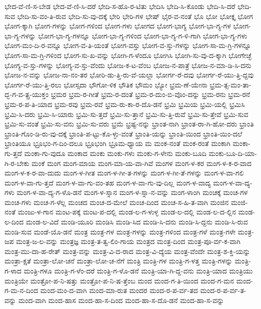 {ಭೇದ-ವೆ-ಣಿ-ಸ-ಬೇಡ
ಭೇದ-ವೆ-ಣಿ-ಸಿ-ದರೆ
ಭೇದಿ-ಸ-ಹೊ-ರ-ಟಿತು
ಭೇದಿಸಿ
ಭೇದಿ-ಸಿ-ಕೊಂಡು
ಭೇದಿ-ಸಿ-ದರೆ
ಭೇದಿ-ಸುವ
ಭೇದಿ-ಸು-ವಂ-ತಿ-ರುವ
ಭೇದಿ-ಸು-ವು-ದಕ್ಕೆ
ಭೇರಿ
ಭೇರಿ-ಗಳ
ಭೇಷ್
ಭೈರ-ವ-ನಂತೆ
ಭೊ
ಭೋ
ಭೋಕ್ತೃ
ಭೋಗ
ಭೋಗ-ಕ್ಕಾಗಿ
ಭೋಗ-ಗಳನ್ನು
ಭೋಗ-ಗಳಿಂದ
ಭೋಗ-ಗಳು
ಭೋಗದ
ಭೋಗ-ಭಾಗ್ಯ
ಭೋಗ-ಭಾ-ಗ್ಯ-ಗಳ
ಭೋಗ-ಭಾ-ಗ್ಯ-ಗಳನ್ನು
ಭೋಗ-ಭಾ-ಗ್ಯ-ಗಳನ್ನೂ
ಭೋಗ-ಭಾ-ಗ್ಯ-ಗಳಿಂದ
ಭೋಗ-ಭಾ-ಗ್ಯ-ಗ-ಳಿ-ಗಾಗಿ
ಭೋಗ-ಭಾ-ಗ್ಯ-ಗಳು
ಭೋಗ-ಮಂ-ದಿ-ರ-ವನ್ನೂ
ಭೋಗ-ವ-ತಿ-ಯಂತೆ
ಭೋಗ-ವಸ್ತು
ಭೋಗ-ವ-ಸ್ತು-ಗಳನ್ನು
ಭೋಗ-ಸಾ-ಮ-ಗ್ರಿ-ಗಳನ್ನೂ
ಭೋಗ-ಸಾ-ಮ-ಗ್ರಿ-ಗಳಿಂದ
ಭೋಗ-ಸು-ಖ-ವನ್ನು
ಭೋಗಿ-ಗ-ಳೆಂದೂ
ಭೋಗಿಸಿ
ಭೋಗಿ-ಸು-ವು-ದ-ಕ್ಕಾಗಿ
ಭೋಗೇಚ್ಛೆ
ಭೋಗ್ಯ-ವ-ಸ್ತು-ಗಳನ್ನು
ಭೋಗ್ಯ-ವ-ಸ್ತು-ವೆಂದು
ಭೋಜ-ಕ-ಟ-ವೆಂಬ
ಭೋಜ-ನ-ಪಾತ್ರೆ
ಭೋಜ-ನ-ಮಾ-ಡಿ-ಸಿ-ದನು
ಭೋಜ-ನ-ವನ್ನು
ಭೋಜ-ನಾ-ನಂ-ತರ
ಭೋರಿ-ಡು-ತ್ತಿ-ರು-ವೆ-ಯಲ್ಲಾ
ಭೋರ್ಗ-ರೆ-ದವು
ಭೋರ್ಗ-ರೆ-ಯು-ತ್ತಿ-ದ್ದವು
ಭೋರ್ಗ-ರೆ-ಯು-ತ್ತಿ-ರಲು
ಭೋಸ್ಸದಾ
ಭೌಗೋ-ಳಿಕ
ಭೌತಿಕ
ಭೌಮಂ
ಭ್ಯೋ
ಭ್ರಮ-ಣೆ-ಯೇನಾ
ಭ್ರಮ-ತ್ಸ-ಮಂ-ತಾ-ದ್ಭ-ಗ-ವ-ತ್ಪ್ರ-ಯುಕ್ತಂ
ಭ್ರಮರ
ಭ್ರಮ-ರ-ಗೀತೆ
ಭ್ರಮ-ರ-ದಂತೆ
ಭ್ರಮ-ರ-ದುಂ-ಬಿ-ವೊಂ-ದನ್ನು
ಭ್ರಮ-ರನು
ಭ್ರಮ-ರನೆ
ಭ್ರಮ-ರ-ಪ-ತಿ-ಯಾದ
ಭ್ರಮ-ರವು
ಭ್ರಮ-ರವೆ
ಭ್ರಮ-ರು-ಕಾ-ರ-ದೊ-ಡನೆ
ಭ್ರಮಿ
ಭ್ರಮಿಯ
ಭ್ರಮಿ-ಯಲ್ಲಿ
ಭ್ರಮಿಸಿ
ಭ್ರಮಿ-ಸಿ-ದರು
ಭ್ರಮಿ-ಸಿ-ಯಾರು
ಭ್ರಮಿ-ಸು-ತ್ತದೆ
ಭ್ರಮಿ-ಸು-ತ್ತಾನೆ
ಭ್ರಮಿ-ಸು-ತ್ತಿ-ರುವೆ
ಭ್ರಮಿ-ಸು-ತ್ತೇವೆ
ಭ್ರಮಿ-ಸುವ
ಭ್ರಮಿ-ಸು-ವಂತೆ
ಭ್ರಮಿ-ಸು-ವನು
ಭ್ರಮಿ-ಸು-ವರು
ಭ್ರಮೆ
ಭ್ರಷ್ಟ-ನನ್ನು
ಭ್ರಾಂತ-ನಾಗಿ
ಭ್ರಾಂತ-ರಾ-ಗಿ-ಹೋ-ದರು
ಭ್ರಾಂತಿ
ಭ್ರಾಂತಿ-ಗೊಂ-ಡಿ-ರು-ವು-ದಕ್ಕೆ
ಭ್ರಾಂತಿ-ಪ-ಟ್ಟು-ಕೊ-ಳ್ಳು-ವಂತೆ
ಭ್ರಾಂತಿ-ಯನ್ನು
ಭ್ರಾಂತಿ-ಯಿಂದ
ಭ್ರಾಂತಿ-ಯಿಂ-ದಲೆ
ಭ್ರಾಂತಿಯೂ
ಭ್ರೂಭಂ-ಗ-ದಿಂ-ದಲೂ
ಭ್ರೂಭಂಗಿ
ಭ್ರೂಮ-ಧ್ಯಾಯ
ಮ
ಮಂಕ-ನಂತೆ
ಮಂಕ-ರಂತೆ
ಮಂಕಾಗಿ
ಮಂಕಾ-ಗು-ತ್ತದೆ
ಮಂಕಾ-ಗು-ವುದೂ
ಮಂಕಾದ
ಮಂಕು
ಮಂಕು-ಗಳು
ಮಂಕು-ಗ-ಳೇನು
ಮಂಕು-ಬೂದಿ
ಮಂಕು-ಬೂ-ದಿ-ಯಾ-ಗಿ-ರ-ಬೇಕು
ಮಂಕೆ
ಮಂಗ
ಮಂಗ-ಮಾಯ
ಮಂಗ-ಮಾ-ಯ-ವಾ-ಗಿವೆ
ಮಂಗಳ
ಮಂಗ-ಳ-ಕರ
ಮಂಗ-ಳ-ಕ-ರ-ವಾದ
ಮಂಗ-ಳ-ಕ-ರ-ವಾ-ದುದು
ಮಂಗ-ಳ-ಗೀತ
ಮಂಗ-ಳ-ಗೀ-ತ-ಗಳನ್ನು
ಮಂಗ-ಳ-ಗೀ-ತೆ-ಗಳನ್ನು
ಮಂಗ-ಳ-ವಾ-ಗಲಿ
ಮಂಗ-ಳ-ವಾ-ಗು-ತ್ತದೆ
ಮಂಗ-ಳ-ವಾ-ಗು-ವಂ-ತಹ
ಮಂಗ-ಳ-ವಾ-ಗು-ವು-ದಿಲ್ಲ
ಮಂಗ-ಳ-ವಾದ್ಯ
ಮಂಗ-ಳ-ವಾ-ದ್ಯ-ಗಳು
ಮಂಗ-ಳ-ವಾ-ದ್ಯ-ಗ-ಳೊ-ಡನೆ
ಮಂಗ-ಳ-ಸ್ನಾನ
ಮಂಗ-ಳ-ಸ್ನಾ-ನ-ವನ್ನು
ಮಂಗ-ಳಾಂಗಿ
ಮಂಚಕ್ಕೆ
ಮಂಚ-ಗಳ
ಮಂಚ-ಗಳು
ಮಂಚ-ಗ-ಳೆಲ್ಲ
ಮಂಚದ
ಮಂಚ-ದ-ಮೇಲೆ
ಮಂಚ-ದಿಂದ
ಮಂಚ-ಸ-ಹಿ-ತ-ವಾಗಿ
ಮಂಜಿನ
ಮಂಜಿ-ನಂತೆ
ಮಂಜು-ಳ-ಗಾನ
ಮಂಟ-ಪಕ್ಕೆ
ಮಂಟ-ಪ-ದಲ್ಲಿ
ಮಂಡ-ಲ-ಗ-ಳುಳ್ಳ
ಮಂಡ-ಲ-ದಲ್ಲಿ
ಮಂಡ-ಲ-ದ-ಲ್ಲಿನ
ಮಂಡ-ಲ-ದಿಂದ
ಮಂಡ-ಲ-ವಿದೆ
ಮಂಡಿ-ಯೂರಿ
ಮಂಡಿಸಿ
ಮಂಡಿ-ಸಿದ
ಮಂಡಿ-ಸಿ-ದನು
ಮಂಡಿ-ಸಿ-ದ್ದನು
ಮಂಡಿ-ಸಿ-ರುವ
ಮಂಡಿ-ಸುವ
ಮಂಡೆ-ಯೊ-ಡನೆ
ಮಂತ್ರ
ಮಂತ್ರ-ಗಳ
ಮಂತ್ರ-ಗಳನ್ನು
ಮಂತ್ರ-ಗಳಿಂದ
ಮಂತ್ರ-ಗಳೆ
ಮಂತ್ರ-ಗಳೇ
ಮಂತ್ರ-ಜಪ
ಮಂತ್ರ-ಜ-ಲ-ವನ್ನು
ಮಂತ್ರಜ್ಞ
ಮಂತ್ರ-ತ-ತ್ವ-ಲಿಂ-ಗಾಯ
ಮಂತ್ರದ
ಮಂತ್ರ-ದಿಂದ
ಮಂತ್ರ-ಪೂ-ರ್ವ-ಕ-ವಾಗಿ
ಮಂತ್ರ-ಮು-ದಾ-ಹ-ರೇತ್
ಮಂತ್ರ-ವನ್ನು
ಮಂತ್ರ-ವಿ-ದ-ರಾದ
ಮಂತ್ರ-ವಿ-ದ್ಯೆಯ
ಮಂತ್ರ-ವೆಂದೇ
ಮಂತ್ರ-ಶ-ಕ್ತಿ-ಯನ್ನು
ಮಂತ್ರಾ-ಕ್ಷತೆ
ಮಂತ್ರಾ-ಲೋ-ಚನೆ
ಮಂತ್ರಾ-ಲೋ-ಚ-ನೆಗೆ
ಮಂತ್ರಿ
ಮಂತ್ರಿ-ಗಳ
ಮಂತ್ರಿ-ಗ-ಳತ್ತ
ಮಂತ್ರಿ-ಗಳನ್ನು
ಮಂತ್ರಿ-ಗ-ಳಾದ
ಮಂತ್ರಿ-ಗಳೂ
ಮಂತ್ರಿ-ಗ-ಳೆಂ-ದರೆ
ಮಂತ್ರಿ-ಗ-ಳೊ-ಡನೆ
ಮಂತ್ರಿ-ಯಾ-ಗಿ-ದ್ದ-ವನು
ಮಂತ್ರಿ-ಯಾದ
ಮಂತ್ರಿಯು
ಮಂತ್ರಿಯೇ
ಮಂತ್ರೋ-ಪ-ನಿ-ಷತ್ತು
ಮಂತ್ರೋ-ಪ-ನಿ-ಷ-ತ್ತೆಂಬ
ಮಂದ
ಮಂದ-ಗ-ತಿ-ಯಿಂದ
ಮಂದ-ಗ-ಮನ
ಮಂದ-ಗ-ಮ-ನ-ದಿಂದ
ಮಂದ-ಮಂ-ದ-ವಾಗಿ
ಮಂದ-ಮಾ-ರುತ
ಮಂದರ
ಮಂದ-ರ-ಪ-ರ್ವ-ತದ
ಮಂದ-ರ-ಪ-ರ್ವ-ತ-ವನ್ನು
ಮಂದ-ವಾಗಿ
ಮಂದ-ಹಾಸ
ಮಂದ-ಹಾ-ಸ-ದಿಂದ
ಮಂದ-ಹಾ-ಸ-ದೊ-ಡನೆ
ಮಂದ-ಹಾ-ಸ-ವನ್ನು
}
